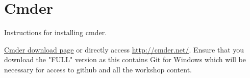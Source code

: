\section{Cmder}
\label{sec:cmder}

Instructions for installing cmder.

\href{http://cmder.net/}{Cmder download page} or directly access \url{http://cmder.net/}.
Ensure that you download the "FULL" version as this contains Git for Windows which will be necessary for access to github and all the workshop content.

